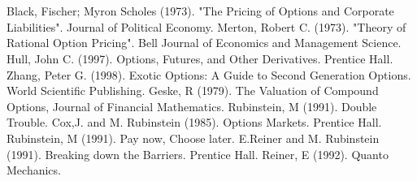 \documentclass{article}
\begin{document}
\newpage
\section*{} \label{bibsection}


\begin{thebibliography}{MMMMM} 
 Black, Fischer; Myron Scholes (1973). "The Pricing of Options and Corporate Liabilities". Journal of Political Economy.
 Merton, Robert C. (1973). "Theory of Rational Option Pricing". Bell Journal of Economics and Management Science.
 Hull, John C. (1997). Options, Futures, and Other Derivatives. Prentice Hall.
 Zhang, Peter G. (1998). Exotic Options: A Guide to Second Generation Options. World Scientific Publishing.
 Geske, R (1979). The Valuation of Compound Options, Journal of Financial Mathematics.
 Rubinstein, M (1991). Double Trouble.
 Cox,J. and M. Rubinstein (1985). Options Markets. Prentice Hall.
 Rubinstein, M (1991). Pay now, Choose later.
 E.Reiner and M. Rubinstein (1991). Breaking down the Barriers. Prentice Hall.
 Reiner, E (1992). Quanto Mechanics.


\end{thebibliography}


\end{document}
